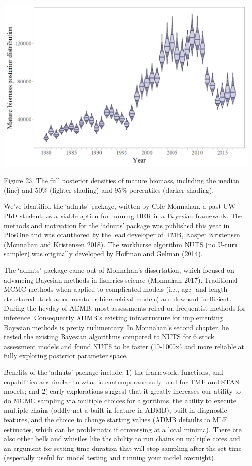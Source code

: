 \documentclass[]{article}
\begin{document}
\includegraphics[width=1\linewidth]{../../HER/figs/HER/posterior_matbiomass}

Figure 23. The full posterior densities of mature biomass, including the
median (line) and 50\% (lighter shading) and 95\% percentiles (darker
shading).

We've identified the `adnuts' package, written by Cole Monnahan, a past
UW PhD student, as a viable option for running HER in a Bayesian
framework. The methods and motivation for the `adnuts' package was
published this year in PlosOne and was coauthored by the lead developer
of TMB, Kasper Kristensen (Monnahan and Kristensen 2018). The workhorse
algorithm NUTS (no U-turn sampler) was originally developed by Hoffman
and Gelman (2014).

The `adnuts' package came out of Monnahan's dissertation, which focused
on advancing Bayesian methods in fisheries science (Monnahan 2017).
Traditional MCMC methods when applied to complicated models (i.e., age-
and length-structured stock assessments or hierarchical models) are slow
and inefficient. During the heyday of ADMB, most assessments relied on
frequentist methods for inference. Consequently ADMB's existing
infrastructure for implementing Bayesian methods is pretty rudimentary.
In Monnahan's second chapter, he tested the existing Bayesian algorithms
compared to NUTS for 6 stock assessment models and found NUTS to be
faster (10-1000x) and more reliable at fully exploring posterior
parameter space.

Benefits of the `adnuts' package include: 1) the framework, functions,
and capabilities are similar to what is contemporaneously used for TMB
and STAN models; and 2) early explorations suggest that it greatly
increases our ability to do MCMC sampling via multiple choices for
algorithms, the ability to execute multiple chains (oddly not a built-in
feature in ADMB), built-in diagnostic features, and the choice to change
starting values (ADMB defaults to MLE estimates, which can be
problematic if converging at a local minima). There are also other bells
and whistles like the ability to run chains on multiple cores and an
argument for setting time duration that will stop sampling after the set
time (especially useful for model testing and running your model
overnight).
\end{document}

